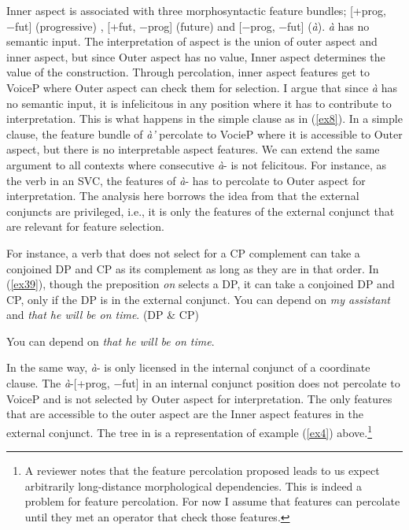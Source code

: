 \documentclass[output=paper,colorlinks,citecolor=brown]{langscibook}
\begin{document}
Inner aspect is associated with three morphosyntactic feature bundles; [+prog, −fut] ({progressive}) , [+fut, −prog] ({future}) and [−prog, −fut] (\emph{à}).  \emph{à} has no semantic input. The interpretation of aspect is the union of outer aspect and inner aspect, but since Outer aspect has no value, Inner aspect determines the value of the construction. Through percolation, inner aspect features get to VoiceP where Outer aspect can check them for selection.  I argue that since \emph{à} has no semantic input, it is infelicitous in any position where it has to contribute to interpretation. This is what happens in the simple clause as in (\ref{ex8}). In a simple clause, the feature bundle of \emph{à'}  percolate to VocieP where it is accessible to Outer aspect, but there is no interpretable aspect features. We can extend the same argument to all contexts where consecutive \emph{à}- is not felicitous. For instance, as the verb in an SVC, the features of \emph{à}- has to percolate to Outer aspect for interpretation. The analysis here borrows the idea from  \citet{Zhang2009} that the external conjuncts are privileged, i.e., it is only the features of the external conjunct that are relevant for feature selection. 

For instance, a verb that does not select for a CP complement can take a conjoined DP and CP as its complement as long as they are in that order. In (\ref{ex39}), though the preposition \emph{ on} selects a DP, it can take a conjoined DP and CP, only if the DP is in the external conjunct.
\ea\label{ex39}
\ea You can depend on \textit{my assistant} and \textit{that he will be on time}. (DP \& CP)

\ex You can depend on \textit{that he will be on time}.

\z 
\z  In the same way, \emph{à}-  is only licensed in the internal conjunct of a coordinate clause. The \emph{à}-[+prog, −fut] in an internal conjunct position does not percolate to VoiceP and is not selected by Outer aspect for interpretation. The only features that are accessible to the outer aspect are the Inner aspect features in the external conjunct. The tree in  is a representation of example (\ref{ex4}) above.\footnote{A reviewer notes that the feature percolation proposed leads to us expect arbitrarily long-distance morphological dependencies. This is indeed a problem for feature percolation. For now I assume that features can percolate until they met an operator that check those features.}  
\end{document}
